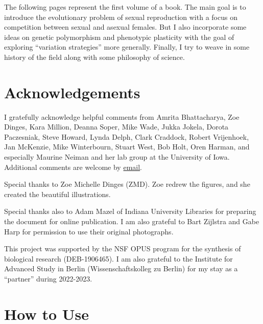 \documentclass[
  letterpaper,
]{book}
\begin{document}

The following pages represent the first volume of a book. The main goal
is to introduce the evolutionary problem of sexual reproduction with a
focus on competition between sexual and asexual females. But I also
incorporate some ideas on genetic polymorphism and phenotypic plasticity
with the goal of exploring ``variation strategies'' more generally.
Finally, I try to weave in some history of the field along with some
philosophy of science.

\section*{Acknowledgements}\label{acknowledgements}


I gratefully acknowledge helpful comments from Amrita Bhattacharya, Zoe
Dinges, Kara Million, Deanna Soper, Mike Wade, Jukka Jokela, Dorota
Paczesniak, Steve Howard, Lynda Delph, Clark Craddock, Robert
Vrijenhoek, Jan McKenzie, Mike Winterbourn, Stuart West, Bob Holt, Oren
Harman, and especially Maurine Neiman and her lab group at the
University of Iowa. Additional comments are welcome by
\href{mailto:clively@indiana.edu}{email}.

Special thanks to Zoe Michelle Dinges (ZMD). Zoe redrew the figures, and
she created the beautiful illustrations.

Special thanks also to Adam Mazel of Indiana University Libraries for
preparing the document for online publication. I am also grateful to
Bart Zijlstra and Gabe Harp for permission to use their original
photographs.

This project was supported by the NSF OPUS program for the synthesis of
biological research (DEB-1906465). I am also grateful to the Institute
for Advanced Study in Berlin (Wissenschaftskolleg zu Berlin) for my stay
as a ``partner'' during 2022-2023.

\section*{How to Use}\label{how-to-use}

\end{document}
